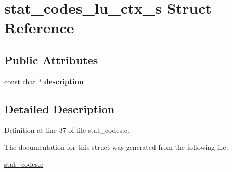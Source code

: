 \hypertarget{structstat__codes__lu__ctx__s}{}\section{stat\+\_\+codes\+\_\+lu\+\_\+ctx\+\_\+s Struct Reference}
\label{structstat__codes__lu__ctx__s}
\subsection*{Public Attributes}
\begin{DoxyCompactItemize}
\item 
const char $\ast$ {\bfseries description}\hypertarget{structstat__codes__lu__ctx__s_a094d42b02a5086705640c32d2735fec5}{}\label{structstat__codes__lu__ctx__s_a094d42b02a5086705640c32d2735fec5}

\end{DoxyCompactItemize}


\subsection{Detailed Description}


Definition at line 37 of file stat\+\_\+codes.\+c.



The documentation for this struct was generated from the following file\+:\begin{DoxyCompactItemize}
\item 
\hyperlink{stat__codes_8c}{stat\+\_\+codes.\+c}\end{DoxyCompactItemize}
